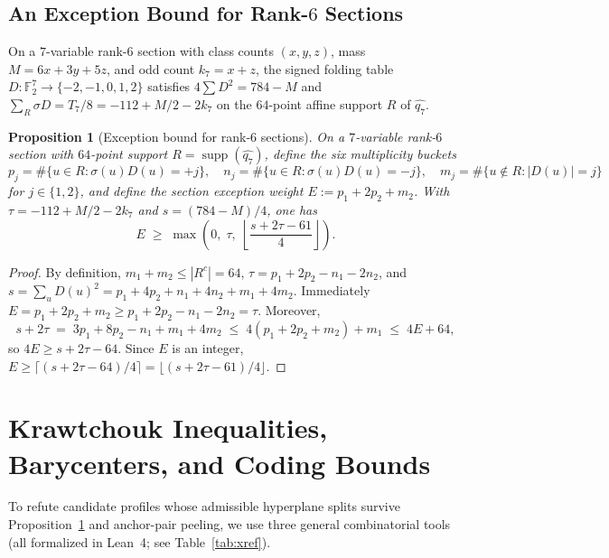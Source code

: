 \documentclass[11pt]{article}
\newtheorem{proposition}[theorem]{Proposition}
\theoremstyle{definition}
\newcommand{\F}{\mathbb{F}}
\newcommand{\supp}{\operatorname{supp}}
\begin{document}
\subsection{An Exception Bound for Rank-$6$ Sections}

On a $7$-variable rank-$6$ section with class counts $(x, y, z)$, mass $M = 6x + 3y + 5z$, and odd count $k_7 = x + z$, the signed folding table $D : \F_2^7 \to \{-2, -1, 0, 1, 2\}$ satisfies $4\sum D^2 = 784 - M$ and $\sum_{R} \sigma D = T_7/8 = -112 + M/2 - 2k_7$ on the $64$-point affine support $R$ of $\widehat{q_7}$.

\begin{proposition}[Exception bound for rank-$6$ sections]
\label{prop:emin}
On a $7$-variable rank-$6$ section with $64$-point support $R = \supp(\widehat{q_7})$, define the six multiplicity buckets
\[
  p_j = \#\{u \in R : \sigma(u)D(u) = +j\},\quad
  n_j = \#\{u \in R : \sigma(u)D(u) = -j\},\quad
  m_j = \#\{u \notin R : |D(u)| = j\}
\]
for $j \in \{1, 2\}$, and define the section exception weight $E := p_1 + 2p_2 + m_2$.
With $\tau = -112 + M/2 - 2k_7$ and $s = (784 - M)/4$, one has
\[
  E \;\ge\; \max\!\left(0,\; \tau,\; \left\lfloor \frac{s + 2\tau - 61}{4} \right\rfloor\right).
\]
\end{proposition}
\begin{proof}
By definition, $m_1 + m_2 \le |R^c| = 64$, $\tau = p_1 + 2p_2 - n_1 - 2n_2$, and $s = \sum_{u} D(u)^2 = p_1 + 4p_2 + n_1 + 4n_2 + m_1 + 4m_2$.
Immediately $E = p_1 + 2p_2 + m_2 \ge p_1 + 2p_2 - n_1 - 2n_2 = \tau$.
Moreover,
\[
  s + 2\tau \;=\; 3p_1 + 8p_2 - n_1 + m_1 + 4m_2 \;\le\; 4(p_1 + 2p_2 + m_2) + m_1 \;\le\; 4E + 64,
\]
so $4E \ge s + 2\tau - 64$. Since $E$ is an integer, $E \ge \lceil(s + 2\tau - 64)/4\rceil = \lfloor(s + 2\tau - 61)/4\rfloor$.
\end{proof}

\section{Krawtchouk Inequalities, Barycenters, and Coding Bounds}
\label{sec:krawtchouk}

To refute candidate profiles whose admissible hyperplane splits survive Proposition~\ref{prop:emin} and anchor-pair peeling, we use three general combinatorial tools (all formalized in Lean~4; see Table~\ref{tab:xref}).
\end{document}
